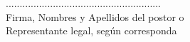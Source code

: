 \begin{landscape}
    \vspace{0.5cm}
    
    \fecha 
    
    \vspace{2cm}
    
    \begin{center}
    ........................................................\\
    Firma, Nombres y Apellidos del postor o \\ 
    Representante legal, según corresponda
    \end{center}
    
    \end{landscape} %